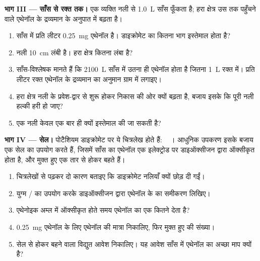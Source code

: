 \begin{problem}
\medskip
\noindent\textbf{भाग III --- साँस से रक्त तक।}
एक व्यक्ति नली से \qty{1.0}{L} साँस फूँकता है; हरा क्षेत्र
उस तक पहुँचने वाले एथेनॉल के द्रव्यमान के अनुपात में बढ़ता है।
\begin{enumerate}[resume]
  \item साँस में प्रति लीटर \qty{0.25}{mg} एथेनॉल है। डाइक्रोमेट
        का कितना भाग इस्तेमाल होता है?
  \item नली \qty{10}{cm} लंबी है। हरा क्षेत्र कितना लंबा है?
  \item साँस-विश्लेषक मानते हैं कि \qty{2100}{L} साँस में उतना ही
        एथेनॉल होता है जितना \qty{1}{L} रक्त में। प्रति लीटर रक्त
        एथेनॉल के द्रव्यमान का अनुमान ग्राम में लगाइए।
  \item हरा क्षेत्र नली के प्रवेश-द्वार से शुरू होकर निकास की ओर क्यों
        बढ़ता है, बजाय इसके कि पूरी नली हल्की
        हरी हो जाए?
  \item एक नली केवल एक बार ही क्यों इस्तेमाल की जा सकती है?
\end{enumerate}

\medskip
\noindent\textbf{भाग IV ---  सेल।}
पोटैशियम डाइक्रोमेट पर ये चित्रलेख होते हैं:
\,\,\,\,\,।
आधुनिक उपकरण इसके बजाय एक  सेल का उपयोग करते हैं, जिसमें साँस का
एथेनॉल एक इलेक्ट्रोड पर डाइऑक्सीजन द्वारा ऑक्सीकृत होता है, और मुक्त हुए
 एक तार से होकर बहते हैं।
\begin{enumerate}[resume]
  \item चित्रलेखों से पढ़कर दो कारण बताइए कि डाइक्रोमेट
        नलियाँ क्यों छोड़ दी गईं।
  \item युग्म / का उपयोग करके डाइऑक्सीजन द्वारा एथेनॉल के
         का समीकरण लिखिए।
  \item एथेनोइक अम्ल में ऑक्सीकृत होते समय एथेनॉल का एक 
        कितने  देता है?
  \item \qty{0.25}{mg} एथेनॉल के लिए एथेनॉल की मात्रा निकालिए,
        फिर मुक्त हुए  की संख्या।
  \item {} सेल से होकर बहने वाला विद्युत आवेश निकालिए।
        यह आवेश साँस में एथेनॉल का अच्छा माप क्यों है?
\end{enumerate}
\end{problem}
